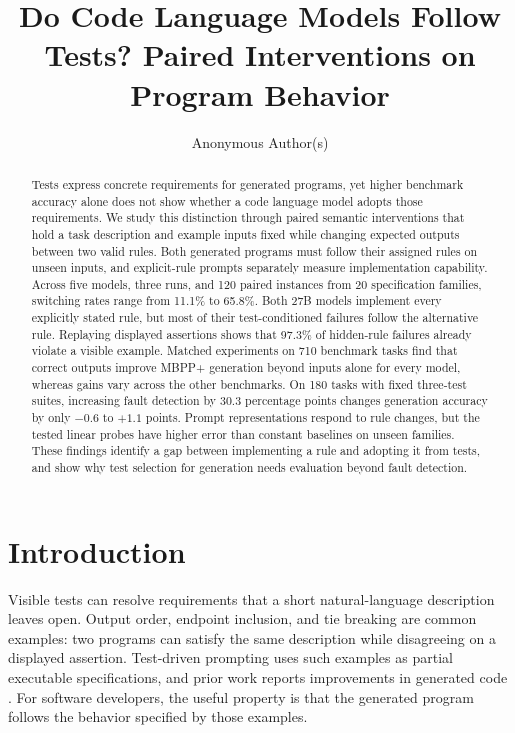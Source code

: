 \documentclass[acmsmall,screen,review,anonymous]{acmart}
\title[Do Code Language Models Follow Tests?]{Do Code Language Models Follow Tests? Paired Interventions on Program Behavior}
\author{Anonymous Author(s)}
\begin{document}
\begin{abstract}
Tests express concrete requirements for generated programs, yet higher benchmark accuracy alone does not show whether a code language model adopts those requirements.
We study this distinction through paired semantic interventions that hold a task description and example inputs fixed while changing expected outputs between two valid rules.
Both generated programs must follow their assigned rules on unseen inputs, and explicit-rule prompts separately measure implementation capability.
Across five models, three runs, and 120 paired instances from 20 specification families, switching rates range from 11.1\% to 65.8\%.
Both 27B models implement every explicitly stated rule, but most of their test-conditioned failures follow the alternative rule.
Replaying displayed assertions shows that 97.3\% of hidden-rule failures already violate a visible example.
Matched experiments on 710 benchmark tasks find that correct outputs improve MBPP+ generation beyond inputs alone for every model, whereas gains vary across the other benchmarks.
On 180 tasks with fixed three-test suites, increasing fault detection by 30.3 percentage points changes generation accuracy by only $-0.6$ to $+1.1$ points.
Prompt representations respond to rule changes, but the tested linear probes have higher error than constant baselines on unseen families.
These findings identify a gap between implementing a rule and adopting it from tests, and show why test selection for generation needs evaluation beyond fault detection.

\end{abstract}


\maketitle

\section{Introduction}

Visible tests can resolve requirements that a short natural-language description leaves open.
Output order, endpoint inclusion, and tie breaking are common examples: two programs can satisfy the same description while disagreeing on a displayed assertion.
Test-driven prompting uses such examples as partial executable specifications, and prior work reports improvements in generated code \citep{mathews2024tdd,fakhoury2024ticoder}.
For software developers, the useful property is that the generated program follows the behavior specified by those examples.
\end{document}
